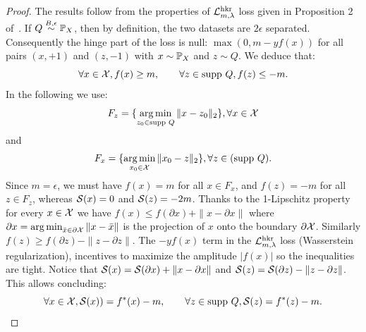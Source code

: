 \hkrsdf*
    \begin{proof}
    The results follow from the properties of $\mathcal{L}^{\text{hkr}}_{m,\lambda}$ loss given in Proposition 2  of~\cite{serrurier2021achieving}. If $Q\stackrel{B,\epsilon}{\sim} \mathbb{P}_X$, then by definition, the two datasets are $2\epsilon$ separated. Consequently the hinge part of the loss is null: $\max{(0,m-yf(x))}$ for all pairs $(x,+1)$ and $(z,-1)$ with $x\sim\mathbb{P}_X$ and $z\sim Q$. We deduce that:
    \begin{equation}\label{eq:hkrsdfeq1}
        \forall x\in\mathcal{X}, f(x)\geq m,\qquad \forall z\in\text{supp }Q, f(z)\leq -m.
    \end{equation}
    In the following we use:
    $$F_z=\{\operatorname*{arg\,min}_{z_0\in\text{supp }Q}\|x-z_0\|_2\},\forall x\in\mathcal{X}$$
    and
    $$F_x=\{\operatorname*{arg\,min}_{x_0\in\mathcal{X}}\|x_0-z\|_2\},\forall z\in(\text{supp }Q).$$
    Since $m=\epsilon$, we must have $f(x)=m$ for all $x\in F_x$, and $f(z)=-m$ for all $z\in F_z$, whereas $\mathcal{S}(x)=0$ and $\mathcal{S}(z)=-2m$. Thanks to the 1-Lipschitz property for every $x\in\mathcal{X}$ we have $f(x)\leq f(\partial x)+\|x-\partial x\|$ where $\partial x=\operatorname*{arg\,min}_{\bar x\in\partial\mathcal{X}}\|x-\bar x\|$ is the projection of $x$ onto the boundary $\partial\mathcal{X}$. Similarly $f(z)\geq f(\partial z)-\|z-\partial z\|$. The $-yf(x)$ term in the $\mathcal{L}^{\text{hkr}}_{m,\lambda}$ loss (Wasserstein regularization), incentives to maximize the amplitude $|f(x)|$ so the inequalities are tight.  Notice that $\mathcal{S}(x)=\mathcal{S}(\partial x)+\|x-\partial x\|$ and $\mathcal{S}(z)=\mathcal{S}(\partial z)-\|z-\partial z\|$. This allows concluding:
    \begin{equation}
        \forall x\in \mathcal{X},\mathcal{S}(x))= f^{*}(x)-m,\qquad \forall z\in\text{supp }Q,\mathcal{S}(z)= f^{*}(z)-m.
    \end{equation}
       

\end{proof}
